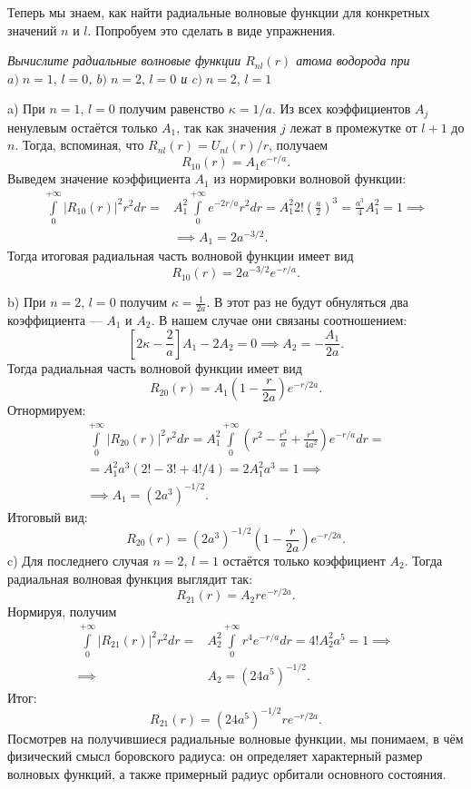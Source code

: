 Теперь мы знаем, как найти радиальные волновые функции для конкретных значений
$n$ и $l$. Попробуем это сделать в виде упражнения.
\newpage
\begin{exercise}
  \textit{Вычислите радиальные волновые функции $R_{nl}(r)$ атома водорода при $
      a)\;n = 1,\, l =0$, $b)\;n = 2,\, l =0$ и $c)\;n = 2,\, l =1$}
\end{exercise}

a) При $n = 1,\, l=0$ получим равенство $\kappa = 1/a$. Из всех коэффициентов
$A_j$ ненулевым остаётся только $A_1$, так как значения $j$ лежат в промежутке
от $l+1$ до $n$. Тогда, вспоминая, что $R_{nl}(r) = U_{nl}(r)/r$, получаем
\[
  R_{10}(r) = A_1e^{-r/a}.
\]
Выведем значение коэффициента $A_1$ из нормировки волновой функции:
\begin{align*}
  \int\limits_0^{+\infty}|R_{10}(r)|^2 r^2 dr = & A^2_1\int\limits_0^{+\infty}e^{-2r/a}r^2 dr = A^2_1 2!\left(\frac{a}{2}\right)^3 = \frac{a^3}{4}A^2_1 = 1 \implies \\
  &\implies A_1 = 2a^{-3/2}.
\end{align*}
Тогда итоговая радиальная часть волновой функции имеет вид
\[
  R_{10}(r) = 2a^{-3/2}e^{-r/a}.
\]

b) При $n = 2,\, l=0$ получим $\kappa = \frac{1}{2a}$. В этот раз не будут
обнуляться два коэффициента --- $A_1$ и $A_2$. В нашем случае они связаны
соотношением:
\[
  \left[ 2\kappa - \frac{2}{a} \right]A_1 - 2A_2 = 0 \implies A_2 = -\frac{A_1}{2a}.
\]
Тогда радиальная часть волновой функции имеет вид
\[
  R_{20}(r) = A_1\left( 1 - \frac{r}{2a} \right) e^{-r/2a}.
\]
Отнормируем:
\begin{gather*}
  \int\limits_0^{+\infty}|R_{20}(r)|^2 r^2 dr = A^2_1\int\limits_0^{+\infty}\left( r^2 - \frac{r^3}{a} +\frac{r^4}{4a^2} \right)e^{-r/a} dr = \\
  = A^2_1 a^3 (2! - 3! + 4!/4) = 2A^2_1 a^3 = 1 \implies \\
  \implies A_1 = (2a^3)^{-1/2}.
\end{gather*}
Итоговый вид:
\[
  R_{20}(r) = (2a^3)^{-1/2}\left( 1 - \frac{r}{2a} \right) e^{-r/2a}.
\]
c) Для последнего случая $n=2,\, l=1$ остаётся только коэффициент $A_2$. Тогда
радиальная волновая функция выглядит так:
\[
  R_{21}(r) = A_2re^{-r/2a}.
\]
Нормируя, получим
\begin{align*}
  \int\limits_0^{+\infty}|R_{21}(r)|^2 r^2 dr = & A^2_2\int\limits_0^{+\infty}r^4 e^{-r/a} dr = 4! A^2_2 a^5 = 1 \implies \\ \implies & A_2 = (24a^5)^{-1/2}.
\end{align*}
Итог:
\[
  R_{21}(r) = (24a^5)^{-1/2}re^{-r/2a}.
\]
Посмотрев на получившиеся радиальные волновые функции, мы понимаем, в чём
физический смысл боровского радиуса: он определяет характерный размер волновых
функций, а также примерный радиус орбитали основного состояния.
\qedsq

